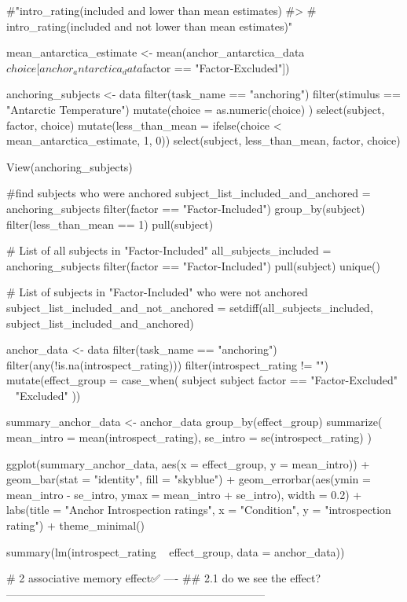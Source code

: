 \documentclass{article}
\begin{document}
#"intro_rating(included and lower than mean estimates) 
#> 
#  intro_rating(included and not lower than mean estimates)"

mean_antarctica_estimate <- mean(anchor_antarctica_data$choice[anchor_antarctica_data$factor == "Factor-Excluded"])

anchoring_subjects <- data %
  filter(task_name == "anchoring") %
  filter(stimulus == "Antarctic Temperature") %
  mutate(choice = as.numeric(choice) ) %
  select(subject, factor, choice) %
  mutate(less_than_mean = ifelse(choice < mean_antarctica_estimate, 1, 0)) %
  select(subject, less_than_mean, factor, choice)

View(anchoring_subjects)

#find subjects who were anchored
subject_list_included_and_anchored = anchoring_subjects %
  filter(factor == "Factor-Included") %
  group_by(subject) %
  filter(less_than_mean == 1) %
  pull(subject)

# List of all subjects in "Factor-Included"
all_subjects_included = anchoring_subjects %
  filter(factor == "Factor-Included") %
  pull(subject) %
  unique()

# List of subjects in "Factor-Included" who were not anchored
subject_list_included_and_not_anchored = setdiff(all_subjects_included, subject_list_included_and_anchored)


anchor_data <- data %
  filter(task_name == "anchoring") %
  filter(any(!is.na(introspect_rating))) %
  filter(introspect_rating != "") %
  mutate(effect_group = case_when(
    subject %
    subject %
    factor == "Factor-Excluded" ~ "Excluded"
  )) 


summary_anchor_data <- anchor_data %
  group_by(effect_group) %
  summarize(
    mean_intro = mean(introspect_rating),
    se_intro = se(introspect_rating)
  )


ggplot(summary_anchor_data, aes(x = effect_group, y = mean_intro)) +
  geom_bar(stat = "identity", fill = "skyblue") +
  geom_errorbar(aes(ymin = mean_intro - se_intro, ymax = mean_intro + se_intro), width = 0.2) +
  labs(title = "Anchor Introspection ratings", x = "Condition", y = "introspection rating") +
  theme_minimal()


summary(lm(introspect_rating ~ effect_group, data = anchor_data))



# 2 associative memory effect✅ ----
    ## 2.1 do we see the effect? -----------------------------------------------------------------------
\end{document}
